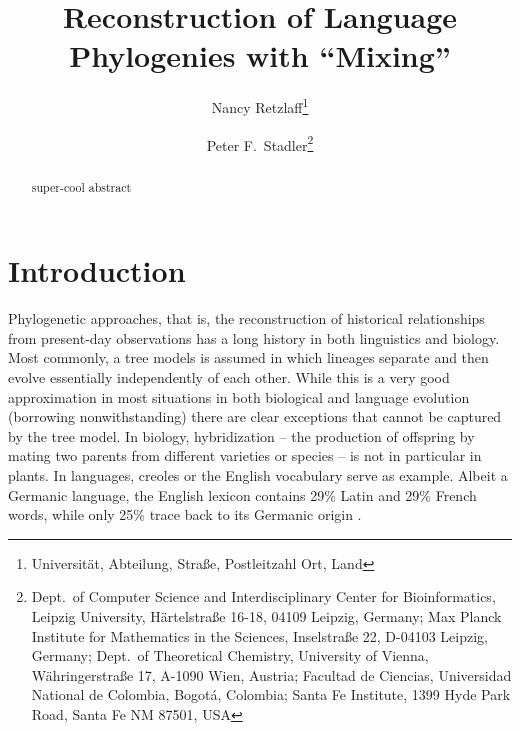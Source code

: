 \documentclass[amsmath]{lni}
\begin{document}
\title[Phylogenetics with Mixing Hybrids]{Reconstruction of Language
  Phylogenies with ``Mixing''}

\author[Nancy Retzlaff \and Peter F.\ Stadler] {Nancy
  Retzlaff\footnote{Universität, Abteilung, Straße, Postleitzahl Ort, Land
    }
  \and
%
  Peter F.\ Stadler\footnote{Dept.\ of Computer Science and
    Interdisciplinary Center for Bioinformatics, Leipzig University,
    H{\"a}rtelstra{\ss}e 16-18, 04109 Leipzig, Germany; Max Planck
    Institute for Mathematics in the Sciences, Inselstra{\ss}e 22, D-04103
    Leipzig, Germany; Dept.\ of Theoretical Chemistry, University of
    Vienna, W{\"a}hringerstra{\ss}e 17, A-1090 Wien, Austria; Facultad de
    Ciencias, Universidad National de Colombia, Bogot{\'a}, Colombia; Santa
    Fe Institute, 1399 Hyde Park Road, Santa Fe NM 87501, USA
    }
}
\maketitle


\begin{abstract}
  super-cool abstract
\end{abstract}


\section{Introduction}

Phylogenetic approaches, that is, the reconstruction of historical
relationships from present-day observations has a long history in both
linguistics and biology. Most commonly, a tree models is assumed in which
lineages separate and then evolve essentially independently of each other.
While this is a very good approximation in most situations in both
biological and language evolution (borrowing nonwithstanding) there are
clear exceptions that cannot be captured by the tree model. In biology,
hybridization -- the production of offspring by mating two parents from
different varieties or species -- is not in particular in plants. In
languages, creoles or the English vocabulary serve as example. Albeit a
Germanic language, the English lexicon contains 29\% Latin and 29\% French
words, while only 25\% trace back to its Germanic origin
\cite{Finkenstaedt:73}.
\end{document}
